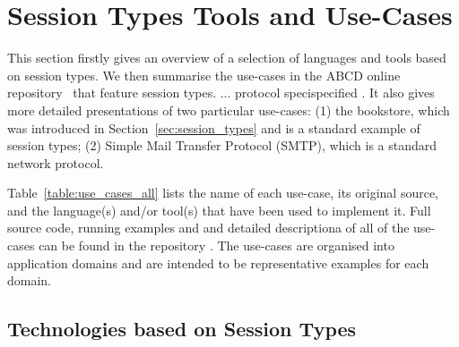 
\section{Session Types Tools and Use-Cases}
\label{sec:usecases}

This section firstly gives an overview of a selection of languages and tools based on session types.  We then summarise the use-cases in the ABCD online repository~\cite{usecase_repository} that feature session types.  ... protocol specispecified . It also gives more detailed presentations of two particular use-cases: (1) the bookstore, which was introduced in Section~\ref{sec:session_types} and is a standard example of session types; (2) Simple Mail Transfer Protocol (SMTP), which is a standard network protocol.

Table~\ref{table:use_cases_all} lists the name of each use-case, its original source, and the language(s) and/or tool(s) that have been used to implement it. Full source code,
running examples and and detailed descriptiona of all of the use-cases can be found in the repository \cite{usecase_repository}.
The use-cases are organised into application domains and are intended to be representative examples for each domain.



\subsection{Technologies based on Session Types}

